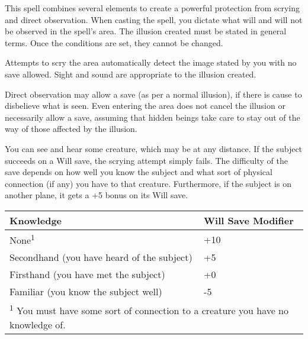 \begin{multicols}{2}
\begin{small}
\noindent This spell combines several elements to create a powerful protection from scrying and direct observation. When casting the spell, you dictate what will and will not be observed in the spell's area. The illusion created must be stated in general terms. Once the conditions are set, they cannot be changed.

\smallskip\noindent Attempts to scry the area automatically detect the image stated by you with no save allowed. Sight and sound are appropriate to the illusion created. 

\smallskip\noindent Direct observation may allow a save (as per a normal illusion), if there is cause to disbelieve what is seen. Even entering the area does not cancel the illusion or necessarily allow a save, assuming that hidden beings take care to stay out of the way of those affected by the illusion.

\noindent You can see and hear some creature, which may be at any distance. If the subject succeeds on a Will save, the scrying attempt simply fails. The difficulty of the save depends on how well you know the subject and what sort of physical connection (if any) you have to that creature. Furthermore, if the subject is on another plane, it gets a +5 bonus on its Will save.
 
\begin{center}
\begin{tabular}[h!]{p{1.75in}|p{1in}}
Knowledge & Will Save Modifier \\ \hline
None\textsuperscript{1} & +10	\\
Secondhand (you have heard of the subject) & +5	\\
Firsthand (you have met the subject) & +0	\\
Familiar (you know the subject well) & -5	\\
\multicolumn{2}{p{3in}}{\textsuperscript{1} You must have some sort of connection to a creature you have no knowledge of.} \\
\end{tabular}
\end{center}


\end{small}
\end{multicols}
